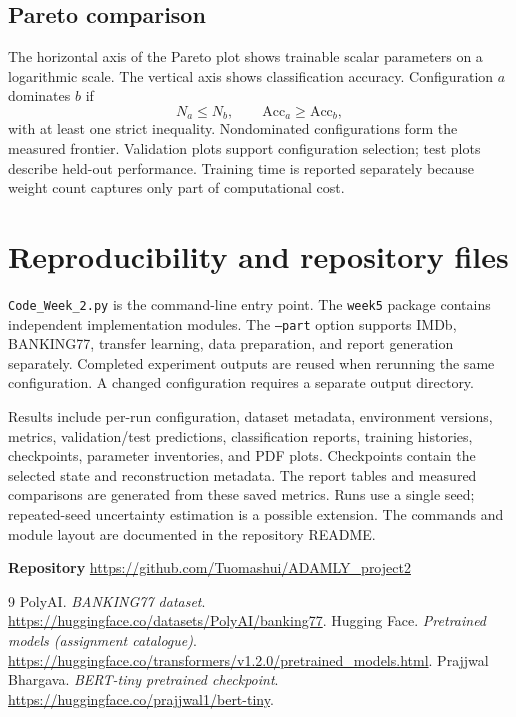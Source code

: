 \documentclass[11pt,a4paper]{article}
\begin{document}
\subsection{Pareto comparison}
The horizontal axis of the Pareto plot shows trainable scalar parameters
on a logarithmic scale. The vertical axis shows classification accuracy.
Configuration $a$ dominates $b$ if
\begin{equation}
N_a\leq N_b,\qquad \mathrm{Acc}_a\geq\mathrm{Acc}_b,
\end{equation}
with at least one strict inequality. Nondominated configurations form
the measured frontier. Validation plots support configuration selection;
test plots describe held-out performance. Training time is reported
separately because weight count captures only part of computational cost.

\clearpage


\section{Reproducibility and repository files}
\texttt{Code\_Week\_2.py} is the command-line entry point.
The \texttt{week5} package contains independent implementation modules.
The \texttt{--part} option supports IMDb, BANKING77, transfer learning,
data preparation, and report generation separately.
Completed experiment outputs are reused when rerunning the same
configuration. A changed configuration requires a separate output
directory.

Results include per-run configuration, dataset metadata, environment
versions, metrics, validation/test predictions, classification reports,
training histories, checkpoints, parameter inventories, and PDF plots.
Checkpoints contain the selected state and reconstruction metadata.
The report tables and measured comparisons are generated from these
saved metrics. Runs use a single seed; repeated-seed uncertainty
estimation is a possible extension.
The commands and module layout are documented in the repository README.

\textbf{Repository}\quad
\url{https://github.com/Tuomashui/ADAMLY_project2}

\begin{thebibliography}{9}
PolyAI. \emph{BANKING77 dataset}.
\url{https://huggingface.co/datasets/PolyAI/banking77}.
Hugging Face. \emph{Pretrained models (assignment catalogue)}.
\url{https://huggingface.co/transformers/v1.2.0/pretrained_models.html}.
Prajjwal Bhargava. \emph{BERT-tiny pretrained checkpoint}.
\url{https://huggingface.co/prajjwal1/bert-tiny}.
\end{thebibliography}
\end{document}
